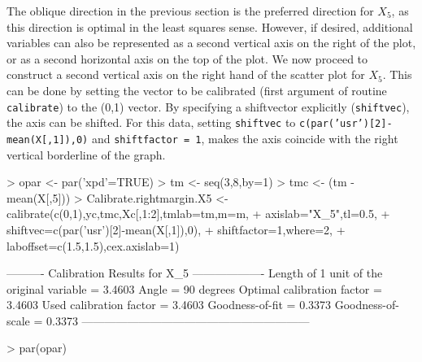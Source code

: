 \documentclass[a4paper]{article}
\begin{document}
The oblique direction in the previous section is the preferred direction for $X_5$, as this direction
is optimal in the least squares sense. However, if desired, additional variables can also be represented
as a second vertical axis on the right of the plot, or as a second horizontal axis on the top of the
plot. We now proceed to construct a second vertical axis on the right hand of the scatter plot for
$X_5$. This can be done by setting the vector to be calibrated (first argument of routine {\tt calibrate})
to the (0,1) vector. By specifying a shiftvector explicitly ({\tt shiftvec}), the axis can be shifted. For 
this data, setting {\tt shiftvec} to {\tt c(par('usr')[2]-mean(X[,1]),0)} and {\tt shiftfactor = 1}, 
makes the axis coincide with the right vertical borderline of the graph.

\begin{Schunk}
\begin{Sinput}
> opar <- par('xpd'=TRUE)
> tm <- seq(3,8,by=1)
> tmc <- (tm - mean(X[,5]))
> Calibrate.rightmargin.X5 <- calibrate(c(0,1),yc,tmc,Xc[,1:2],tmlab=tm,m=m,
+                                       axislab="X_5",tl=0.5,
+                                       shiftvec=c(par('usr')[2]-mean(X[,1]),0),
+                                       shiftfactor=1,where=2,
+                                       laboffset=c(1.5,1.5),cex.axislab=1)
\end{Sinput}
\begin{Soutput}
---------- Calibration Results for  X_5  -------------------
Length of 1 unit of the original variable =  3.4603  
Angle                                     =  90 degrees
Optimal calibration factor                =  3.4603  
Used calibration factor                   =  3.4603  
Goodness-of-fit                           =  0.3373  
Goodness-of-scale                         =  0.3373  
------------------------------------------------------------
\end{Soutput}
\begin{Sinput}
> par(opar)
\end{Sinput}
\end{Schunk}
\end{document}
